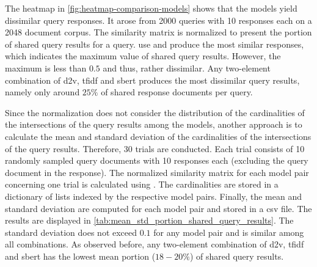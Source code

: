 The heatmap in \autoref{fig:heatmap-comparison-models} shows that the models yield dissimilar query responses.
It arose from 2000 queries with 10 responses each on a 2048 document corpus.
The similarity matrix is normalized to present the portion of shared query results for a query.
\ac{use} and \infersent{} produce the most similar responses, which indicates the maximum value of shared query results.
However, the maximum is less than $0.5$ and thus, rather dissimilar.
Any two-element combination of \ac{d2v}, \ac{tfidf} and \ac{sbert} produces the most dissimilar query results, 
namely only around $25\%$ of shared response documents per query.

Since the normalization does not consider the distribution of the cardinalities of the intersections of the query results among the models,
another approach is to calculate the mean and standard deviation of the cardinalities of the intersections of the query results.
Therefore, 30 trials are conducted.
Each trial consists of 10 randomly sampled query documents with 10 responses each (excluding the query document in the response).
The normalized similarity matrix for each model pair concerning one trial is calculated using .
The cardinalities are stored in a dictionary of lists indexed by the respective model pairs.
Finally, the mean and standard deviation are computed for each model pair and stored in a \ac{csv} file.
The results are displayed in \autoref{tab:mean_std_portion_shared_query_results}.
The standard deviation does not exceed $0.1$ for any model pair and is similar among all combinations.
As observed before, any two-element combination of \ac{d2v}, \ac{tfidf} and \ac{sbert} has the lowest mean portion ($18-20\%$) of shared query results.

